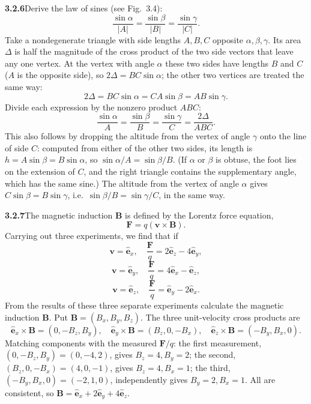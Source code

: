 \par\bigskip
\noindent\textbf{3.2.6}\quad Derive the law of sines (see Fig.~3.4):
\[
\frac{\sin\alpha}{|A|}=\frac{\sin\beta}{|B|}=\frac{\sin\gamma}{|C|}.
\]
\solution
Take a nondegenerate triangle with side lengths $A,B,C$ opposite
$\alpha,\beta,\gamma$. Its area $\Delta$ is half the magnitude of the
cross product of the two side vectors that leave any one vertex. At the
vertex with angle $\alpha$ these two sides have lengths $B$ and $C$
($A$ is the opposite side), so $2\Delta=BC\sin\alpha$; the other two
vertices are treated the same way:
\[
2\Delta=BC\sin\alpha=CA\sin\beta=AB\sin\gamma.
\]
Divide each expression by the nonzero product $ABC$:
\[
\boxed{\frac{\sin\alpha}{A}=\frac{\sin\beta}{B}
=\frac{\sin\gamma}{C}=\frac{2\Delta}{ABC}}.
\]
This also follows by dropping the altitude from the vertex of angle
$\gamma$ onto the line of side $C$: computed from either of the other
two sides, its length is $h=A\sin\beta=B\sin\alpha$, so
$\sin\alpha/A=\sin\beta/B$. (If $\alpha$ or $\beta$ is obtuse, the foot
lies on the extension of $C$, and the right triangle contains the
supplementary angle, which has the same sine.) The altitude from the
vertex of angle $\alpha$ gives $C\sin\beta=B\sin\gamma$, i.e.\
$\sin\beta/B=\sin\gamma/C$, in the same way.

\par\bigskip
\noindent\textbf{3.2.7}\quad The magnetic induction $\mathbf{B}$ is defined by
the Lorentz force equation,
\[
\mathbf{F}=q(\mathbf{v}\times\mathbf{B}).
\]
Carrying out three experiments, we find that if
\[
\mathbf{v}=\hat{\mathbf{e}}_{x},\quad\frac{\mathbf{F}}{q}
=2\hat{\mathbf{e}}_{z}-4\hat{\mathbf{e}}_{y},
\]
\[
\mathbf{v}=\hat{\mathbf{e}}_{y},\quad\frac{\mathbf{F}}{q}
=4\hat{\mathbf{e}}_{x}-\hat{\mathbf{e}}_{z},
\]
\[
\mathbf{v}=\hat{\mathbf{e}}_{z},\quad\frac{\mathbf{F}}{q}
=\hat{\mathbf{e}}_{y}-2\hat{\mathbf{e}}_{x}.
\]
From the results of these three separate experiments calculate the magnetic
induction $\mathbf{B}$.
\solution
Put $\mathbf B=(B_x,B_y,B_z)$. The three unit-velocity cross products are
\[
\hat{\mathbf e}_x\times\mathbf B=(0,-B_z,B_y),\quad
\hat{\mathbf e}_y\times\mathbf B=(B_z,0,-B_x),\quad
\hat{\mathbf e}_z\times\mathbf B=(-B_y,B_x,0).
\]
Matching components with the measured $\mathbf F/q$: the first
measurement, $(0,-B_z,B_y)=(0,-4,2)$, gives $B_z=4,B_y=2$; the second,
$(B_z,0,-B_x)=(4,0,-1)$, gives $B_z=4,B_x=1$; the third,
$(-B_y,B_x,0)=(-2,1,0)$, independently gives $B_y=2,B_x=1$.
All are consistent, so
$\boxed{\mathbf B=\hat{\mathbf e}_x+2\hat{\mathbf e}_y+4\hat{\mathbf e}_z}$.


